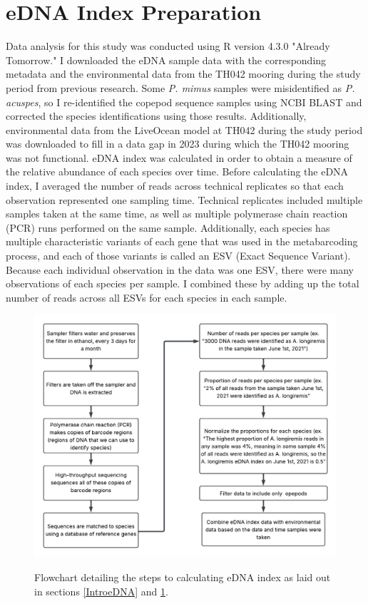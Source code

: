 \documentclass[12pt,twoside]{reedthesis}
\begin{document}
{	\section{eDNA Index Preparation}\label{MethodseDNA}
	Data analysis for this study was conducted using R version 4.3.0 "Already Tomorrow." I downloaded the eDNA sample data with the corresponding metadata and the environmental data from the TH042 mooring during the study period from previous research. Some \textit{P. mimus} samples were misidentified as \textit{P. acuspes}, so I re-identified the copepod sequence samples using NCBI BLAST and corrected the species identifications using those results. Additionally, environmental data from the LiveOcean model at TH042 during the study period was downloaded to fill in a data gap in 2023 during which the TH042 mooring was not functional. eDNA index was calculated in order to obtain a measure of the relative abundance of each species over time. Before calculating the eDNA index, I averaged the number of reads across technical replicates so that each observation represented one sampling time. Technical replicates included multiple samples taken at the same time, as well as multiple polymerase chain reaction (PCR) runs performed on the same sample. Additionally, each species has multiple characteristic variants of each gene that was used in the metabarcoding process, and each of those variants is called an ESV (Exact Sequence Variant). Because each individual observation in the data was one ESV, there were many observations of each species per sample. I combined these by adding up the total number of reads across all ESVs for each species in each sample. 
	
	\begin{figure}[!h]
		\begin{center}
			\includegraphics[scale=0.7]{Fig_MethodsFlowchart} \\
			\caption[Methods]{Flowchart detailing the steps to calculating eDNA index as laid out in sections \ref{IntroeDNA} and \ref{MethodseDNA}.} %
			\label{Flowchart}
		\end{center}
	\end{figure} 
	
}
\end{document}
